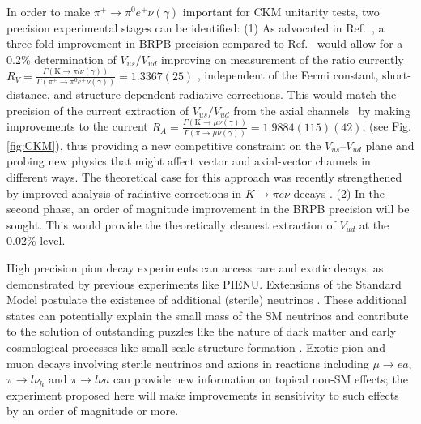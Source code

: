 In order to make $\pi^+ \rightarrow \pi^0 e^+ \nu (\gamma)$ important for CKM unitarity tests, two precision experimental stages can be identified:
(1) As advocated in Ref.~\cite{Czarnecki}, a three-fold improvement in BRPB precision compared to Ref.~\cite{Pocanic3} would allow for a 0.2\% determination of $V_{us}/V_{ud}$ improving on measurement of  the ratio currently 
      $  R_V = \frac{\Gamma\left(\textrm{K} \rightarrow \pi l \nu (\gamma) \right)}{\Gamma\left(\pi^+ \rightarrow \pi^0 e^+ \nu (\gamma)\right)}=1.3367(25)$ ,
    independent of the Fermi constant, short-distance, and structure-dependent radiative corrections. This
    would match the precision of the current extraction of $V_{us} / V_{ud}$ from the axial channels~\cite{Marciano} by making improvements to the current 
        $R_A = \frac{\Gamma\left(\textrm{K} \rightarrow \mu \nu (\gamma) \right)}{\Gamma\left(\pi \rightarrow \mu \nu (\gamma)\right)}=1.9884(115)(42)$,
    (see Fig. \ref{fig:CKM}), thus providing a new competitive constraint on the $V_{us}$--$V_{ud}$ plane and probing new physics that might affect vector and axial-vector channels in different ways.
    The theoretical case for this approach was recently strengthened by improved analysis of radiative corrections in $K \to \pi e \nu $ decays \cite{Seng:2021}.  
(2)  In the second phase, an order of magnitude improvement  in the
BRPB precision will be sought. This would provide the theoretically cleanest extraction of $V_{ud}$ at the 0.02\% level. 

High precision pion decay experiments can access rare and exotic decays, as  demonstrated by
previous experiments like PIENU. Extensions of the Standard Model postulate the
existence of additional (sterile) neutrinos \cite{nuMSM}\cite{BrymanShrock}. These additional states can potentially explain
the small mass of the SM neutrinos and contribute to the solution of outstanding puzzles like
the nature of dark matter  and early cosmological processes like small scale structure formation \cite{bertoni}.  
Exotic pion and muon decays involving sterile neutrinos  and axions in reactions including $\mu\to e a$\cite{Aguilar-Arevalo6},  $\pi \to l \nu_h$\cite{Aguilar-Arevalo1}\cite{Aguilar-Arevalo2} and $\pi \to l \nu a$\cite{Aguilar-Arevalo8} can provide new information on topical non-SM effects; the experiment proposed here will make improvements in sensitivity to such effects by an order of magnitude or more.


%

